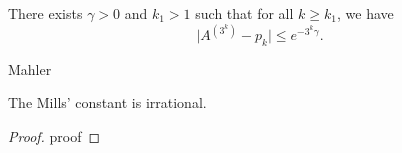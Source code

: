 \begin{lemma}
    \label{lem:lemma7}
    There exists $\gamma > 0$ and $k_1 > 1$ such that for all $k \geq k_1$, we have
    $$
    \lvert A ^ (3 ^ k) - p_k\rvert \leq e^{-3^k\gamma}.
    $$
\end{lemma}

\begin{theorem}
    \label{thm:Mahler}
    Mahler
\end{theorem}

\begin{theorem}
    \label{thm:mills_irrational}
    The Mills' constant is irrational.    
\end{theorem}

\begin{proof}
    proof
\end{proof}